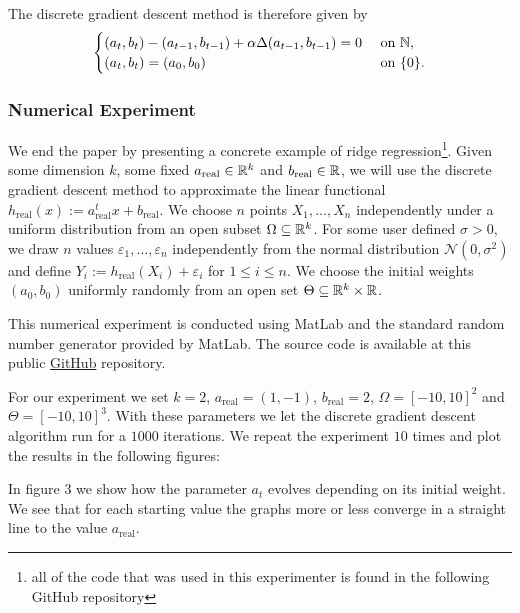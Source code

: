 The discrete gradient descent method is therefore given by
\begin{align*}
	\begin{cases}
		(a_t,b_t)-(a_{t-1},b_{t-1})
		+\alpha \Delta(a_{t-1},b_{t-1}) = 0 & \text{ on }\mathbb{N},\\
		(a_t,b_t)=(a_0,b_0) & \text{ on }\{0\}.
	\end{cases}
\end{align*}

\subsubsection{Numerical Experiment}
We end the paper by presenting a concrete example of ridge
regression\footnote{all of the code that
was used in this experimenter is found in the following
GitHub repository}. Given some dimension $ k $, some fixed $ a_{\mathrm{real}}\in\mathbb{R}^k $
and $ b_{\mathrm{real}}\in\mathbb{R} $, we will use the discrete gradient descent method to
approximate the linear functional
$ h_{\mathrm{real}}(x):=a_{\mathrm{real}}^t x +b_{\mathrm{real}}$.
We choose $ n $ points $ X_1,\ldots,X_n $ independently under
a uniform distribution from an open subset $ \Omega\subseteq\mathbb{R}^k $.
For some user defined $ \sigma>0 $, we draw $ n $
values $ \varepsilon_1,\ldots,\varepsilon_n $ independently 
from the normal distribution
$ \mathcal{N}(0,\sigma^2) $ and define $ Y_i:=h_{\mathrm{real}}(X_i)+\varepsilon_i $
for $ 1\leq i\leq n $. We choose the initial weights $ (a_0,b_0) $ uniformly
randomly from an open set $ \Theta\subseteq\mathbb{R}^k\times\mathbb{R} $.\medskip

This numerical experiment is conducted using MatLab
and the standard random number generator provided by MatLab.
The source code is available at this public
\href{https://github.com/JethroWarnettMath/Semester-Project-Gradient-Flow-HS2021}
{GitHub} repository.\medskip

For our experiment we set $ k=2 $, 
$a_{\mathrm{real}}=(1,-1)$, $ b_{\mathrm{real}}=2 $,
$ \Omega=[-10,10]^2 $ and $ \Theta=[-10,10]^3 $. 
With these parameters we let the discrete gradient descent
algorithm run for a $ 1000 $ iterations. We repeat the
experiment $ 10 $ times and plot the results in the
following figures:\smallskip 

In figure 3 %
we show how the parameter $ a_t $ evolves depending
on its initial weight. We
see that for each starting value the graphs 
more or less converge in a straight line to 
the value $ a_{\mathrm{real}} $. \smallskip

